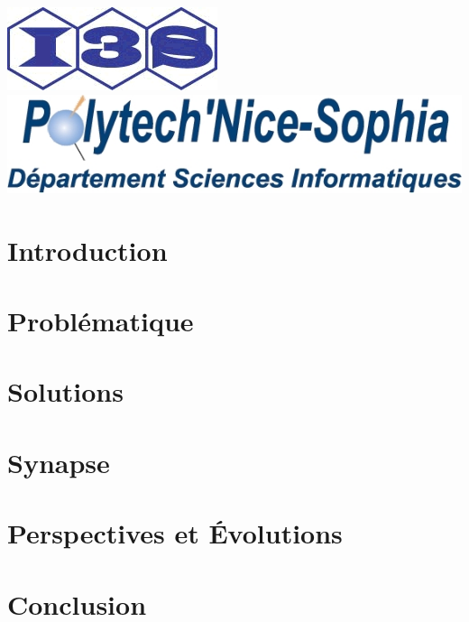 \documentclass[a4paper,oneside,12pt]{article}
\begin{document}
\begin{titlepage}
\includegraphics[scale=0.3]{img/logos/logo-i3s}  ~~~~~~~~~~~~~~~~~~~~~~
\includegraphics[scale=0.3]{img/logos/epu}
\end{titlepage} 
\clearpage

\tableofcontents \clearpage

\section{Introduction}
 
\clearpage

\section{Problématique}
 
\clearpage

\section{Solutions}
 
\clearpage

\section{Synapse}
 
\clearpage

\section{Perspectives et Évolutions}
 
\clearpage

\section{Conclusion}
% 
\clearpage
\end{document}
